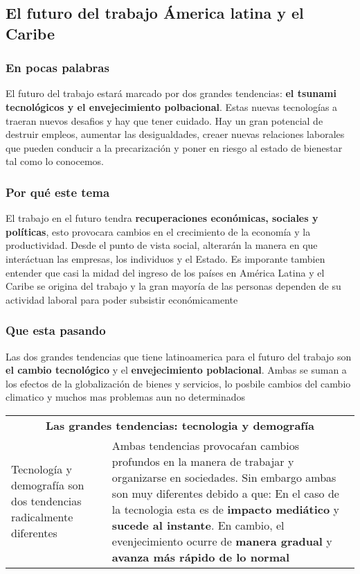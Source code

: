 \subsection{El futuro del trabajo Ámerica latina y el Caribe}
\subsubsection{En pocas palabras}

El futuro del trabajo estará marcado por dos grandes tendencias: {\bf el tsunami tecnológicos y el envejecimiento polbacional}. Estas nuevas tecnologías a traeran nuevos desafios y hay que tener cuidado. Hay un gran potencial de destruir empleos, aumentar las desigualdades, creaer nuevas relaciones laborales que pueden conducir a la precarización y poner en riesgo al estado de bienestar tal como lo conocemos. 

\subsubsection{Por qué este tema}

El trabajo en el futuro tendra {\bf recuperaciones económicas, sociales y políticas}, esto provocara cambios en el crecimiento de la economía y la productividad. Desde el punto de vista social, alterarán la manera en que interáctuan las empresas, los individuos y el Estado. Es imporante tambien entender que casi la midad del ingreso de los países en América  Latina y el Caribe se origina del trabajo y la gran mayoría de las personas dependen de su actividad laboral para poder subsistir económicamente

\subsubsection{Que esta pasando}
Las dos grandes tendencias que tiene latinoamerica para el futuro del trabajo son {\bf el cambio tecnológico} y el {\bf envejecimiento poblacional}. Ambas se suman a los efectos de la globalización de bienes y servicios, lo posbile cambios del cambio climatico y muchos mas problemas aun no determinados

\begingroup
\setlength{\tabcolsep}{12pt} %
\renewcommand{\arraystretch}{1.5} %
\begin{tabular}{p{4cm}|p{11cm}}
\multicolumn{2}{c}{\large \bf Las grandes tendencias: tecnologia y demografía}  \\
Tecnología y demografía son dos tendencias radicalmente diferentes&Ambas tendencias provocaŕan cambios profundos en la manera de trabajar y organizarse en sociedades. Sin embargo ambas son muy diferentes debido a que: En el caso de la tecnologia esta es de {\bf impacto mediático} y {\bf sucede al instante}. En cambio, el evenjecimiento ocurre de {\bf manera gradual} y {\bf avanza más rápido de lo normal}\\ 
\end{tabular}
\endgroup


